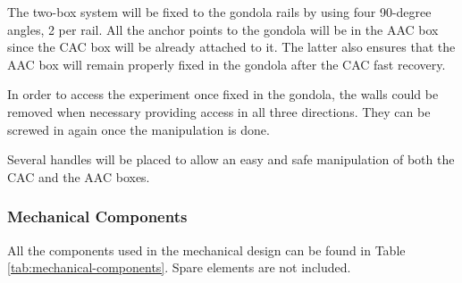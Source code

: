 The two-box system will be fixed to the gondola rails by using four 90-degree angles, 2 per rail. All the anchor points to the gondola will be in the AAC box since the CAC box will be already attached to it. The latter also ensures that the AAC box will remain properly fixed in the gondola after the CAC fast recovery. 

\smallskip
In order to access the experiment once fixed in the gondola, the walls could be removed when necessary providing access in all three directions. They can be screwed in again once the manipulation is done.


Several handles will be placed to allow an easy and safe manipulation of both the CAC and the AAC boxes. 


\subsubsection{Mechanical Components}

All the components used in the mechanical design can be found in Table \ref{tab:mechanical-components}. Spare elements are not included. 


\raggedbottom